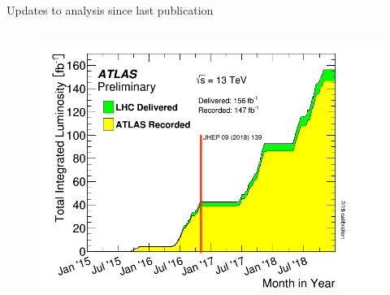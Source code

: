 \documentclass[aspectratio=169,xcolor=table]{beamer}
\begin{document}
\begin{frame}[t]{Updates to analysis since last publication}
\begin{columns}
      \begin{figure}
      \includegraphics[width=1.1\textwidth,keepaspectratio=true]{intlumivstimeRun2.png}
      \caption{\tiny \cite{luminositypublicresultsrun2}}
      \end{figure}
      \end{columns}
    \end{frame}
\end{document}
